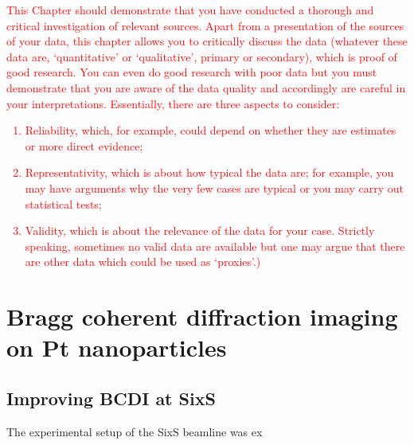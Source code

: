 \textcolor{red}{This Chapter should demonstrate that you have conducted a thorough and critical investigation of relevant sources.
Apart from a presentation of the sources of your data, this chapter allows you to critically discuss the data (whatever these data are, ‘quantitative’ or ‘qualitative’, primary or secondary), which is proof of good research. You can even do good research with poor data but you must demonstrate that you are aware of the data quality and accordingly are careful in your interpretations. Essentially, there are three aspects to consider:
\begin{enumerate}
\item	Reliability, which, for example, could depend on whether they are estimates or more direct evidence;
\item	Representativity, which is about how typical the data are; for example, you may have arguments why the very few cases are typical or you may carry out statistical tests;
\item Validity, which is about the relevance of the data for your case. Strictly speaking, sometimes no valid data are available but one may argue that there are other data which could be used as ‘proxies’.) 
\end{enumerate}
}

\section{Bragg coherent diffraction imaging on Pt nanoparticles}

\subsection{Improving BCDI at SixS}

The experimental setup of the SixS beamline was ex

